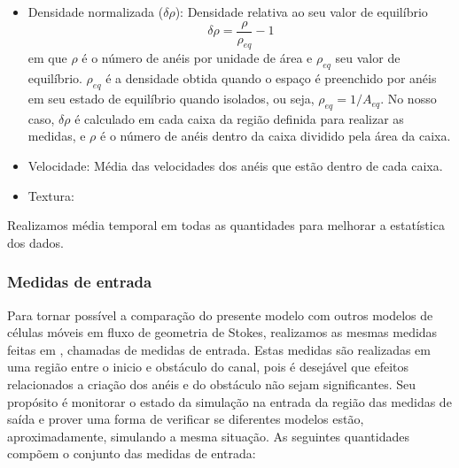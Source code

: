 \documentclass{article}
\theoremstyle{definition}
\begin{document}
\begin{itemize}
    \item Densidade normalizada ($\delta \rho$): Densidade relativa ao seu valor de equilíbrio 
    \begin{equation}
    \delta \rho = \frac{\rho}{\rho_{eq}} - 1
    \label{eq:rel_den}
    \end{equation}
    em que $\rho$ é o número de anéis por unidade de área e $\rho_{eq}$ seu valor de equilíbrio. $\rho_{eq}$ é a densidade obtida quando o espaço é preenchido por anéis em seu estado de equilíbrio quando isolados, ou seja, $\rho_{eq} = 1 / A_{eq}$. No nosso caso, $\delta \rho$ é calculado em cada caixa da região definida para realizar as medidas, e $\rho$ é o número de anéis dentro da caixa dividido pela área da caixa.
    
    \item Velocidade: Média das velocidades dos anéis que estão dentro de cada caixa.
    
    \item Textura: 
\end{itemize}

Realizamos média temporal em todas as quantidades para melhorar a estatística dos dados.

\subsubsection{Medidas de entrada}
Para tornar possível a comparação do presente modelo com outros modelos de células móveis em fluxo de geometria de Stokes, realizamos as mesmas medidas feitas em \cite{beatrici_comparing_2023}, chamadas de medidas de entrada. Estas medidas são realizadas em uma região entre o inicio e obstáculo do canal, pois é desejável que efeitos relacionados a criação dos anéis e do obstáculo não sejam significantes. Seu propósito é monitorar o estado da simulação na entrada da região das medidas de saída e prover uma forma de verificar se diferentes modelos estão, aproximadamente, simulando a mesma situação.
As seguintes quantidades compõem o conjunto das medidas de entrada:
\end{document}
